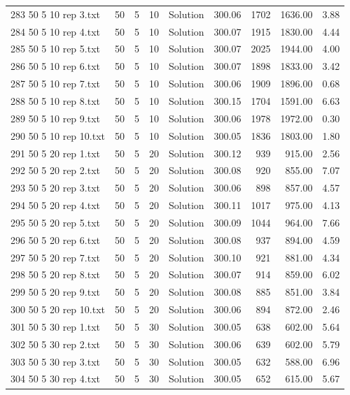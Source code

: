 \begin{longtable}{lrrllrrrr}
283 50 5 10 rep 3.txt & 50 & 5 & 10 & Solution & 300.06 & 1702 & 1636.00 &  3.88\\
284 50 5 10 rep 4.txt & 50 & 5 & 10 & Solution & 300.07 & 1915 & 1830.00 &  4.44\\
285 50 5 10 rep 5.txt & 50 & 5 & 10 & Solution & 300.07 & 2025 & 1944.00 &  4.00\\
286 50 5 10 rep 6.txt & 50 & 5 & 10 & Solution & 300.07 & 1898 & 1833.00 &  3.42\\
287 50 5 10 rep 7.txt & 50 & 5 & 10 & Solution & 300.06 & 1909 & 1896.00 &  0.68\\
288 50 5 10 rep 8.txt & 50 & 5 & 10 & Solution & 300.15 & 1704 & 1591.00 &  6.63\\
289 50 5 10 rep 9.txt & 50 & 5 & 10 & Solution & 300.06 & 1978 & 1972.00 &  0.30\\
290 50 5 10 rep 10.txt & 50 & 5 & 10 & Solution & 300.05 & 1836 & 1803.00 &  1.80\\
291 50 5 20 rep 1.txt & 50 & 5 & 20 & Solution & 300.12 & 939 & 915.00 &  2.56\\
292 50 5 20 rep 2.txt & 50 & 5 & 20 & Solution & 300.08 & 920 & 855.00 &  7.07\\
293 50 5 20 rep 3.txt & 50 & 5 & 20 & Solution & 300.06 & 898 & 857.00 &  4.57\\
294 50 5 20 rep 4.txt & 50 & 5 & 20 & Solution & 300.11 & 1017 & 975.00 &  4.13\\
295 50 5 20 rep 5.txt & 50 & 5 & 20 & Solution & 300.09 & 1044 & 964.00 &  7.66\\
296 50 5 20 rep 6.txt & 50 & 5 & 20 & Solution & 300.08 & 937 & 894.00 &  4.59\\
297 50 5 20 rep 7.txt & 50 & 5 & 20 & Solution & 300.10 & 921 & 881.00 &  4.34\\
298 50 5 20 rep 8.txt & 50 & 5 & 20 & Solution & 300.07 & 914 & 859.00 &  6.02\\
299 50 5 20 rep 9.txt & 50 & 5 & 20 & Solution & 300.08 & 885 & 851.00 &  3.84\\
300 50 5 20 rep 10.txt & 50 & 5 & 20 & Solution & 300.06 & 894 & 872.00 &  2.46\\
301 50 5 30 rep 1.txt & 50 & 5 & 30 & Solution & 300.05 & 638 & 602.00 &  5.64\\
302 50 5 30 rep 2.txt & 50 & 5 & 30 & Solution & 300.06 & 639 & 602.00 &  5.79\\
303 50 5 30 rep 3.txt & 50 & 5 & 30 & Solution & 300.05 & 632 & 588.00 &  6.96\\
304 50 5 30 rep 4.txt & 50 & 5 & 30 & Solution & 300.05 & 652 & 615.00 &  5.67\\

\end{longtable}
